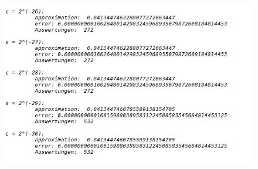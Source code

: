 \documentclass{article}
\begin{document}
\begin{figure}[h!]
				\includegraphics[scale=0.6]{aufgabe2part3.jpg}
			\end{figure}
		\pagebreak
\end{document}
